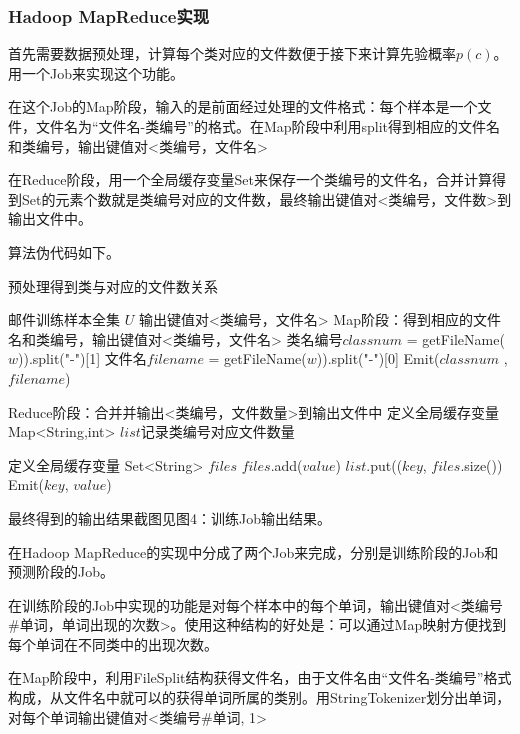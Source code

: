 \documentclass[lang=cn,11pt]{elegantpaper}
\begin{document}
\subsubsection{Hadoop MapReduce实现}
首先需要数据预处理，计算每个类对应的文件数便于接下来计算先验概率$p(c)$。用一个Job来实现这个功能。

在这个Job的Map阶段，输入的是前面经过处理的文件格式：每个样本是一个文件，文件名为“文件名-类编号”的格式。在Map阶段中利用split得到相应的文件名和类编号，输出键值对<类编号，文件名>

在Reduce阶段，用一个全局缓存变量Set来保存一个类编号的文件名，合并计算得到Set的元素个数就是类编号对应的文件数，最终输出键值对<类编号，文件数>到输出文件中。

算法伪代码如下。
\begin{algorithm}[!htb]
  \caption{预处理得到类与对应的文件数关系}
  \label{alg:Framwork}
  \begin{algorithmic}[1]
    \Require
    邮件训练样本全集 $U$
    \Ensure
    输出键值对<类编号，文件名>
    \State Map阶段：得到相应的文件名和类编号，输出键值对<类编号，文件名>
        \State 类名编号$classnum$ = getFileName($w$)).split("-")[1]
		 \State 文件名$filename$ = getFileName($w$)).split("-")[0]
        \State Emit($classnum$ , $filename$)
      \EndFor
   \EndFunction

  \State Reduce阶段：合并并输出<类编号，文件数量>到输出文件中
  \State 定义全局缓存变量 Map<String,int> $list$记录类编号对应文件数量
  
    \State 定义全局缓存变量 Set<String> $files$
        \State $files$.add($value$)
    \EndFor
    \State $list$.put(($key$, $files$.size())
  \EndFunction
        \State Emit($key$, $value$)
    \EndFor
  \EndFunction
  \end{algorithmic}
\end{algorithm}

最终得到的输出结果截图见图4：训练Job输出结果。

在Hadoop MapReduce的实现中分成了两个Job来完成，分别是训练阶段的Job和预测阶段的Job。

在训练阶段的Job中实现的功能是对每个样本中的每个单词，输出键值对<类编号\#单词，单词出现的次数>。使用这种结构的好处是：可以通过Map映射方便找到每个单词在不同类中的出现次数。

在Map阶段中，利用FileSplit结构获得文件名，由于文件名由“文件名-类编号”格式构成，从文件名中就可以的获得单词所属的类别。用StringTokenizer划分出单词，对每个单词输出键值对<类编号\#单词, 1>
\end{document}
